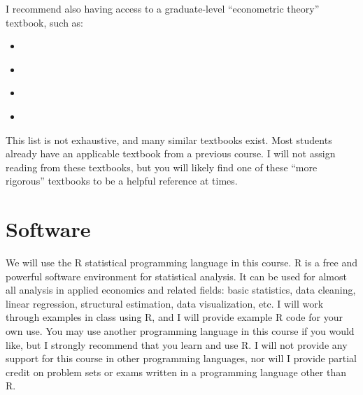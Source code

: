 \documentclass[11pt,letterpaper]{article}
\begin{document}
\noindent I recommend also having access to a graduate-level ``econometric theory'' textbook, such as:
\begin{itemize}
	\item[] \begin{refsection} \nocite{cameronMicroeconometricsMethodsApplications2005} \printbibliography[heading=none] \end{refsection}
  \item[] \begin{refsection} \nocite{greeneEconometricAnalysis2018} \printbibliography[heading=none] \end{refsection}
  \item[] \begin{refsection} \nocite{hayashiEconometrics2000} \printbibliography[heading=none] \end{refsection}
	\item[] \begin{refsection} \nocite{wooldridgeEconomtericAnalysisCross2010} \printbibliography[heading=none] \end{refsection}
\end{itemize}
This list is not exhaustive, and many similar textbooks exist. Most students already have an applicable textbook from a previous course. I will not assign reading from these textbooks, but you will likely find one of these ``more rigorous'' textbooks to be a helpful reference at times.

\section*{Software}

We will use the R statistical programming language in this course. R is a free and powerful software environment for statistical analysis. It can be used for almost all analysis in applied economics and related fields: basic statistics, data cleaning, linear regression, structural estimation, data visualization, etc. I will work through examples in class using R, and I will provide example R code for your own use. You may use another programming language in this course if you would like, but I strongly recommend that you learn and use R. I will not provide any support for this course in other programming languages, nor will I provide partial credit on problem sets or exams written in a programming language other than R. \\
\end{document}
